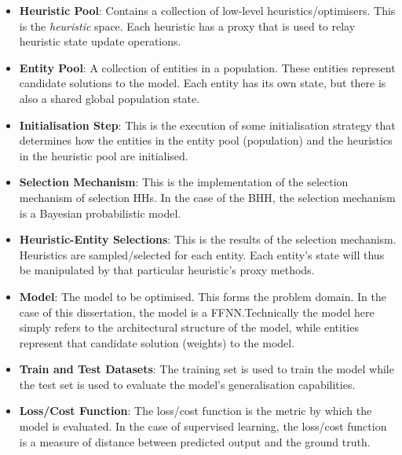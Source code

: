 \begin{itemize}
    \item \textbf{Heuristic Pool}: Contains a collection of low-level heuristics/optimisers. This is the \textit{heuristic} space. Each heuristic has a proxy that is used to relay heuristic state update operations.
    
    \item \textbf{Entity Pool}: A collection of entities in a population. These entities represent candidate solutions to the model. Each entity has its own state, but there is also a shared global population state.
    
    \item \textbf{Initialisation Step}: This is the execution of some initialisation strategy that determines how the entities in the entity pool (population) and the heuristics in the heuristic pool are initialised.
    
    \item \textbf{Selection Mechanism}: This is the implementation of the selection mechanism of selection \acp{HH}. In the case of the \ac{BHH}, the selection mechanism is a Bayesian probabilistic model.
    
    \item \textbf{Heuristic-Entity Selections}: This is the results of the selection mechanism. Heuristics are sampled/selected for each entity. Each entity's state will thus be manipulated by that particular heuristic's proxy methods.
    
    \item \textbf{Model}: The model to be optimised. This forms the problem domain. In the case of this dissertation, the model is a \ac{FFNN}.Technically the model here simply refers to the architectural structure of the model, while entities represent that candidate solution (weights) to the model.
    
    \item \textbf{Train and Test Datasets}: The training set is used to train the model while the test set is used to evaluate the model's generalisation capabilities.
    
    \item \textbf{Loss/Cost Function}: The loss/cost function is the metric  by which the model is evaluated. In the case of supervised learning, the loss/cost function is a measure of distance between predicted output and the ground truth.
    

\end{itemize}
